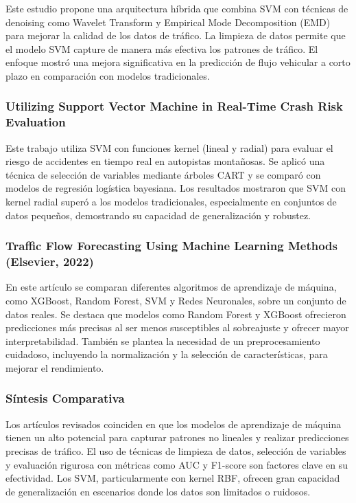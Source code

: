 \documentclass{svproc} %
\begin{document}
Este estudio propone una arquitectura híbrida que combina SVM con técnicas de denoising como Wavelet Transform y Empirical Mode Decomposition (EMD) para mejorar la calidad de los datos de tráfico. La limpieza de datos permite que el modelo SVM capture de manera más efectiva los patrones de tráfico. El enfoque mostró una mejora significativa en la predicción de flujo vehicular a corto plazo en comparación con modelos tradicionales.

\subsubsection{Utilizing Support Vector Machine in Real-Time Crash Risk Evaluation}

Este trabajo utiliza SVM con funciones kernel (lineal y radial) para evaluar el riesgo de accidentes en tiempo real en autopistas montañosas. Se aplicó una técnica de selección de variables mediante árboles CART y se comparó con modelos de regresión logística bayesiana. Los resultados mostraron que SVM con kernel radial superó a los modelos tradicionales, especialmente en conjuntos de datos pequeños, demostrando su capacidad de generalización y robustez.

\subsubsection{Traffic Flow Forecasting Using Machine Learning Methods (Elsevier, 2022)}

En este artículo se comparan diferentes algoritmos de aprendizaje de máquina, como XGBoost, Random Forest, SVM y Redes Neuronales, sobre un conjunto de datos reales. Se destaca que modelos como Random Forest y XGBoost ofrecieron predicciones más precisas al ser menos susceptibles al sobreajuste y ofrecer mayor interpretabilidad. También se plantea la necesidad de un preprocesamiento cuidadoso, incluyendo la normalización y la selección de características, para mejorar el rendimiento.

\subsubsection*{Síntesis Comparativa}

Los artículos revisados coinciden en que los modelos de aprendizaje de máquina tienen un alto potencial para capturar patrones no lineales y realizar predicciones precisas de tráfico. El uso de técnicas de limpieza de datos, selección de variables y evaluación rigurosa con métricas como AUC y F1-score son factores clave en su efectividad. Los SVM, particularmente con kernel RBF, ofrecen gran capacidad de generalización en escenarios donde los datos son limitados o ruidosos.
\end{document}
